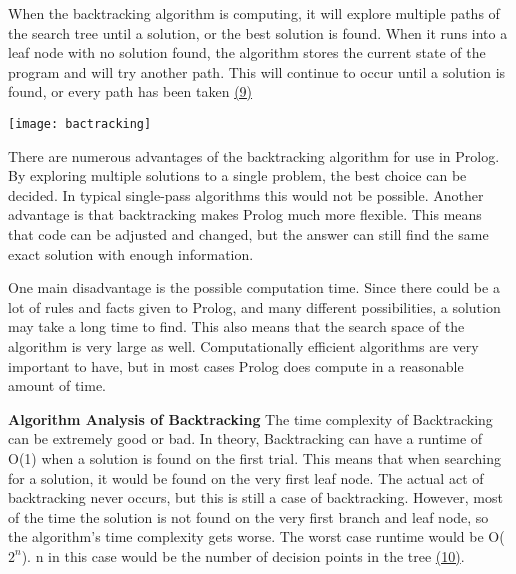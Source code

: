 \documentclass{article}
\theoremstyle{theorem}
\theoremstyle{definition}
\theoremstyle{remark}
\begin{document}
\noindent\newline When the backtracking algorithm is computing, it will explore multiple paths of the search tree until a solution, or the best solution is found. When it runs into a leaf node with no solution found, the algorithm stores the current state of the program and will try another path. This will continue to occur until a solution is found, or every path has been taken \href{https://www.simplilearn.com/tutorials/data-structure-tutorial/backtracking-algorithm}{(9)}

\texttt{[image: bactracking]}\noindent\newline

\noindent\newline There are numerous advantages of the backtracking algorithm for use in Prolog. By exploring multiple solutions to a single problem, the best choice can be decided. In typical single-pass algorithms this would not be possible. Another advantage is that backtracking makes Prolog much more flexible. This means that code can be adjusted and changed, but the answer can still find the same exact solution with enough information. 

\noindent\newline One main disadvantage is the possible computation time. Since there could be a lot of rules and facts given to Prolog, and many different possibilities, a solution may take a long time to find. This also means that the search space of the algorithm is very large as well. Computationally efficient algorithms are very important to have, but in most cases Prolog does compute in a reasonable amount of time.

\noindent\newline\newline\textbf{Algorithm Analysis of Backtracking}
\noindent\newline The time complexity of Backtracking can be extremely good or bad. In theory, Backtracking can have a runtime of O(1) when a solution is found on the first trial. This means that when searching for a solution, it would be found on the very first leaf node. The actual act of backtracking never occurs, but this is still a case of backtracking. However, most of the time the solution is not found on the very first branch and leaf node, so the algorithm's time complexity gets worse. The worst case runtime would be O($2^n$). n in this case would be the number of decision points in the tree \href{https://athena.ecs.csus.edu/~mei/logicp/Programming_in_Prolog.pdf}{(10)}.
\end{document}
